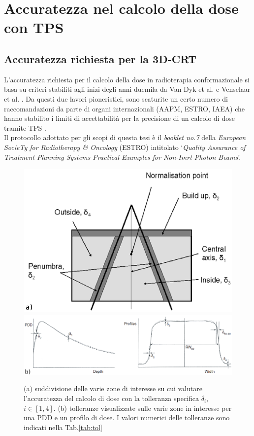 \section{Accuratezza nel calcolo della dose con TPS}
\subsection{Accuratezza richiesta per la 3D-CRT}
\label{sec:accu_3D}
L'accuratezza richiesta per il calcolo della dose in radioterapia conformazionale si basa su criteri stabiliti agli inizi degli anni duemila da Van Dyk et al. e Venselaar et al. \cite{Dyk1993,Venselaar2001}. Da questi due lavori pioneristici, sono scaturite un certo numero di raccomandazioni da parte di organi internazionali (AAPM, ESTRO, IAEA) che hanno stabilito i limiti di accettabilità per la precisione di un calcolo di dose tramite TPS \cite{Fraass1998,Mijnheer2004,IAEA430}.\\
Il protocollo adottato per gli scopi di questa tesi è il \textit{booklet no.7} della \textit{European SocieTy for Radiotherapy \& Oncology} (ESTRO) intitolato `\textit{Quality Assurance of Treatment Planning Systems Practical Examples for Non-Imrt Photon Beams}'. 
\begin{figure}[!t]
\centering
\includegraphics[width=.65\textwidth]{./cap2/Accuracy_zones.png}\\\vspace{.3cm}
\includegraphics[width=\textwidth]{./cap2/Accuracy_pdd_prof.png}
\caption{(a) suddivisione delle varie zone di interesse su cui valutare l'accuratezza del calcolo di dose con la tolleranza specifica $\delta_i$, $i\in[1,4]$. (b) tolleranze visualizzate sulle varie zone in interesse per una PDD e un profilo di dose. I valori numerici delle tolleranze sono indicati nella Tab.\ref{tab:tol}}
\label{fig:accuracy_zones}
\end{figure}

